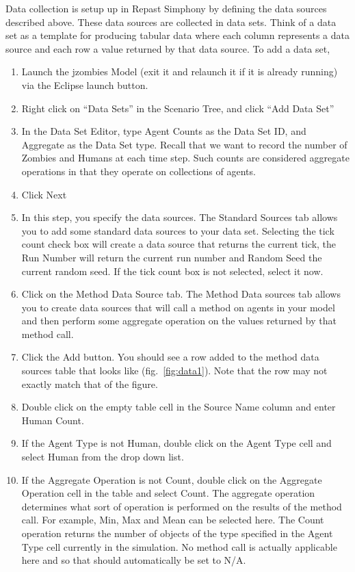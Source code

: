 \documentclass[11pt]{amsart}
\begin{document}
Data collection is setup up in Repast Simphony by defining the data sources described above. These data sources are collected in data sets. Think of a data set as a template for producing tabular data where each column represents a data source and each row a value returned by that data source. To add a data set, 

\vspace{.2in}
\begin{enumerate}
\item Launch the jzombies Model (exit it and relaunch it if it is already running) via the Eclipse launch button.
\item Right click on ``Data Sets'' in the Scenario Tree, and click ``Add Data Set''
\item In the Data Set Editor, type Agent Counts as the Data Set ID, and Aggregate as the Data Set type. Recall that we want to 
record the number of Zombies and Humans at each time step. Such counts are considered aggregate operations in that they operate on collections of agents.
\item Click Next
\item In this step, you specify the data sources. The Standard Sources tab allows you to add some standard data sources to your data set. Selecting the tick count check box will create a data source that returns the current tick, the Run Number will return the current run number and Random Seed the current random seed. If the tick count box is not selected, select it now.
\item Click on the Method Data Source tab. The Method Data sources tab allows you to create data sources that will call a method on agents in your model and then perform some aggregate operation on the values returned by that method call.
\item Click the Add button. You should see a row added to the method data sources table that looks like  (fig.~\ref{fig:data1}). Note that the row may not exactly match that of the figure.
\item Double click on the empty table cell in the Source Name column and enter Human Count. 
\item If the Agent Type is not Human, double click on the Agent Type cell and select Human from the drop down list.
\item If the Aggregate Operation is not Count, double click on the Aggregate Operation cell in the table and select Count. The aggregate operation determines what sort of operation is performed on the results of the method call. For example, Min, Max and Mean can be selected here. The Count operation returns the number of objects of the type specified in the Agent Type cell currently in the simulation. No method call is actually applicable here and so that should automatically be set to N/A.

\end{enumerate}
\end{document}
